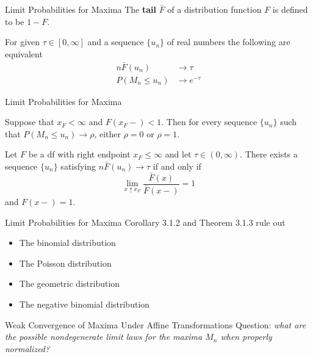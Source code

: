\documentclass{beamer}
\begin{document}
\begin{frame}{Limit Probabilities for Maxima}
    The \textbf{tail} $\bar{F}$ of a distribution function $F$ is defined to be $1 - F$.
    \begin{theorem}[3.1.1]
        For given $\tau \in [0, \infty]$ and a sequence $\{u_n\}$ of real numbers the following are equivalent
        \begin{align*}
            n\bar{F}(u_n) &\to \tau \\
            P(M_n \le u_n) &\to e^{-\tau}
        \end{align*}
    \end{theorem}
\end{frame}

\begin{frame}{Limit Probabilities for Maxima}
    \begin{corollary}[3.1.2]
        Suppose that $x_F < \infty$ and $F(x_F-) < 1$. Then for every sequence $\{u_n\}$ such that $P(M_n \le u_n) \to \rho$, either $\rho = 0$ or $\rho = 1$.
    \end{corollary}
    \begin{theorem}[3.1.3]
        Let $F$ be a df with right endpoint $x_F \le \infty$ and let $\tau \in (0, \infty)$. There exists a sequence $\{u_n\}$ satisfying $n\bar{F}(u_n) \to \tau$ if and only if
        \[
        \lim_{x \uparrow x_F} \frac{\bar{F}(x)}{\bar{F}(x-)} = 1
        \]
        and $F(x-) = 1$.
    \end{theorem}
\end{frame}

\begin{frame}{Limit Probabilities for Maxima}
    Corollary 3.1.2 and Theorem 3.1.3 rule out
    \begin{itemize}
        \item The binomial distribution
        \item The Poisson distribution
        \item The geometric distribution
        \item The negative binomial distribution
    \end{itemize}
\end{frame}

\begin{frame}{Weak Convergence of Maxima Under Affine Transformations}
    Question: \textit{what are the possible nondegenerate limit laws for the maxima $M_n$ when properly normalized?}
\end{frame}
\end{document}
